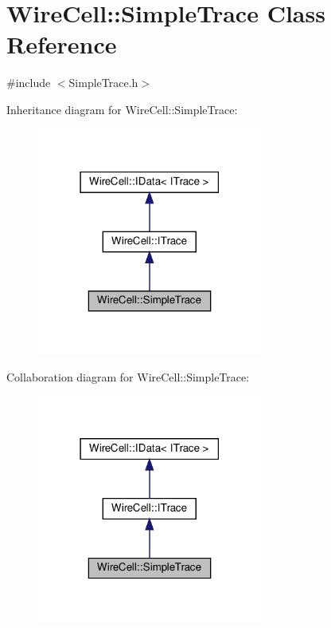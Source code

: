 \hypertarget{class_wire_cell_1_1_simple_trace}{}\section{Wire\+Cell\+:\+:Simple\+Trace Class Reference}
\label{class_wire_cell_1_1_simple_trace}


{\ttfamily \#include $<$Simple\+Trace.\+h$>$}



Inheritance diagram for Wire\+Cell\+:\+:Simple\+Trace\+:
\nopagebreak
\begin{figure}[H]
\begin{center}
\leavevmode
\includegraphics[width=210pt]{class_wire_cell_1_1_simple_trace__inherit__graph}
\end{center}
\end{figure}


Collaboration diagram for Wire\+Cell\+:\+:Simple\+Trace\+:
\nopagebreak
\begin{figure}[H]
\begin{center}
\leavevmode
\includegraphics[width=210pt]{class_wire_cell_1_1_simple_trace__coll__graph}
\end{center}
\end{figure}
